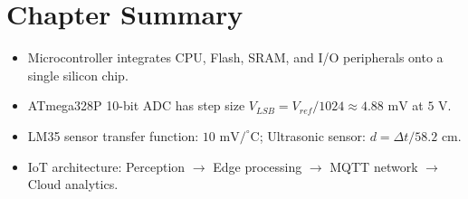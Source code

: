 \section{Chapter Summary}
\begin{itemize}[leftmargin=1.5em]
    \item Microcontroller integrates CPU, Flash, SRAM, and I/O peripherals onto a single silicon chip.
    \item ATmega328P 10-bit ADC has step size $V_{LSB} = V_{ref} / 1024 \approx 4.88\text{ mV}$ at $5\text{ V}$.
    \item LM35 sensor transfer function: $10\text{ mV}/^\circ\text{C}$; Ultrasonic sensor: $d = \Delta t / 58.2\text{ cm}$.
    \item IoT architecture: Perception $\to$ Edge processing $\to$ MQTT network $\to$ Cloud analytics.
\end{itemize}
